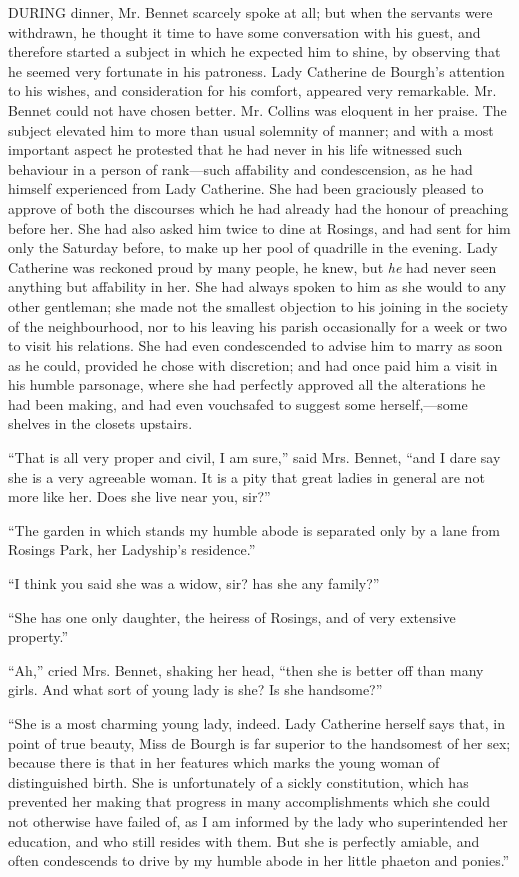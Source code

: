 \documentclass[12pt,openright]{book}
\begin{document}
\noindent  DURING dinner, Mr. Bennet scarcely spoke at all; but when the servants were withdrawn, he thought it time to have some conversation with his guest, and therefore started a subject in which he expected him to shine, by observing that he seemed very fortunate in his patroness. Lady Catherine de Bourgh’s attention to his wishes, and consideration for his comfort, appeared very remarkable. Mr. Bennet could not have chosen better. Mr. Collins was eloquent in her praise. The subject elevated him to more than usual solemnity of manner; and with a most important aspect he protested that he had never in his life witnessed such behaviour in a person of rank—such affability and condescension, as he had himself experienced from Lady Catherine. She had been graciously pleased to approve of both the discourses which he had already had the honour of preaching before her. She had also asked him twice to dine at Rosings, and had sent for him only the Saturday before, to make up her pool of quadrille in the evening. Lady Catherine was reckoned proud by many people, he knew, but \textit{he} had never seen anything but affability in her. She had always spoken to him as she would to any other gentleman; she made not the smallest objection to his joining in the society of the neighbourhood, nor to his leaving his parish occasionally for a week or two to visit his relations. She had even condescended to advise him to marry as soon as he could, provided he chose with discretion; and had once paid him a visit in his humble parsonage, where she had perfectly approved all the alterations he had been making, and had even vouchsafed to suggest some herself,—some shelves in the closets upstairs.

“That is all very proper and civil, I am sure,” said Mrs. Bennet, “and I dare say she is a very agreeable woman. It is a pity that great ladies in general are not more like her. Does she live near you, sir?”

“The garden in which stands my humble abode is separated only by a lane from Rosings Park, her Ladyship’s residence.”

“I think you said she was a widow, sir? has she any family?”

“She has one only daughter, the heiress of Rosings, and of very extensive property.”

“Ah,” cried Mrs. Bennet, shaking her head, “then she is better off than many girls. And what sort of young lady is she? Is she handsome?”

“She is a most charming young lady, indeed. Lady Catherine herself says that, in point of true beauty, Miss de Bourgh is far superior to the handsomest of her sex; because there is that in her features which marks the young woman of distinguished birth. She is unfortunately of a sickly constitution, which has prevented her making that progress in many accomplishments which she could not otherwise have failed of, as I am informed by the lady who superintended her education, and who still resides with them. But she is perfectly amiable, and often condescends to drive by my humble abode in her little phaeton and ponies.”
\end{document}
